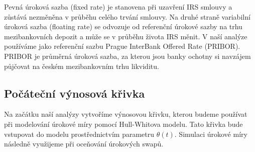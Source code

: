 \documentclass[a4paper,12pt]{report}
\theoremstyle{definition} \newtheorem{definice}[veta]{Definice}
\theoremstyle{remark}
\begin{document}
Pevná úroková sazba (fixed rate) je stanovena při uzavření IRS smlouvy a zůstává nezměněna v průběhu celého trvání smlouvy. 
Na druhé straně variabilní úroková sazba (floating rate) se odvozuje od referenční úrokové sazby na trhu mezibankovních depozit a může se v průběhu života IRS měnit.
V naší analýze používáme  jako referenční sazbu Prague InterBank Offered Rate (PRIBOR).
PRIBOR je průměrná úroková sazba, za kterou jsou banky ochotny si navzájem půjčovat na českém mezibankovním trhu likviditu.


\subsection{Počáteční výnosová křivka}\label{vynosova_krivka_kap}
Na začátku naší analýzy vytvoříme výnosovou křivku, kterou budeme používat při modelování úrokové míry pomocí Hull-Whitova modelu. %
Tato křivka bude vstupovat do modelu prostřednictvím parametru $\theta(t)$. 
Simulaci úrokové míry následně využijeme při oceňování úrokových swapů. %
\end{document}
